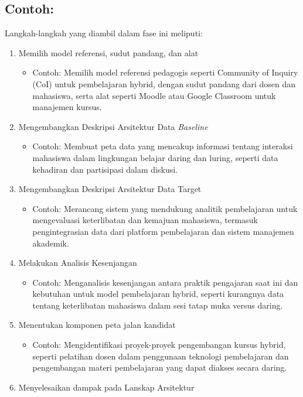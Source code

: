 \subsection*{Contoh:}
Langkah-langkah yang diambil dalam fase ini meliputi:
\begin{enumerate}
	\item Memilih model referensi, sudut pandang, dan alat
	\begin{itemize}
		\item Contoh: Memilih model referensi pedagogis seperti Community of Inquiry (CoI) untuk pembelajaran hybrid, dengan sudut pandang dari dosen dan mahasiswa, serta alat seperti Moodle atau Google Classroom untuk manajemen kursus.
	\end{itemize}
	\item Mengembangkan Deskripsi Arsitektur Data \textit{Baseline}
	\begin{itemize}
		\item Contoh: Membuat peta data yang mencakup informasi tentang interaksi mahasiswa dalam lingkungan belajar daring dan luring, seperti data kehadiran dan partisipasi dalam diskusi.
	\end{itemize}
	\item Mengembangkan Deskripsi Arsitektur Data Target
	\begin{itemize}
		\item Contoh: Merancang sistem yang mendukung analitik pembelajaran untuk mengevaluasi keterlibatan dan kemajuan mahasiswa, termasuk pengintegrasian data dari platform pembelajaran dan sistem manajemen akademik.
	\end{itemize}
	\item Melakukan Analisis Kesenjangan
	\begin{itemize}
		\item Contoh: Menganalisis kesenjangan antara praktik pengajaran saat ini dan kebutuhan untuk model pembelajaran hybrid, seperti kurangnya data tentang keterlibatan mahasiswa dalam sesi tatap muka versus daring.
	\end{itemize}
	\item Menentukan komponen peta jalan kandidat
	\begin{itemize}
		\item Contoh: Mengidentifikasi proyek-proyek pengembangan kursus hybrid, seperti pelatihan dosen dalam penggunaan teknologi pembelajaran dan pengembangan materi pembelajaran yang dapat diakses secara daring.
	\end{itemize}
	\item Menyelesaikan dampak pada Lanskap Arsitektur

\end{enumerate}
